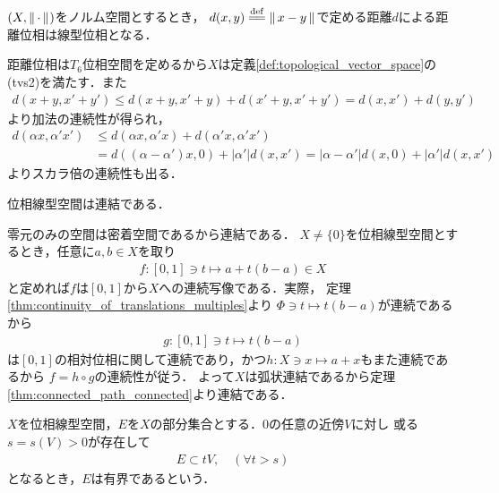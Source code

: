 	\begin{screen}
		\begin{thm}[ノルムで導入する距離位相は線型位相]
			$(X,\left\|\, \cdot\, \right\|_{})$をノルム空間とするとき，
			$d(x,y) \defeq \Norm{x-y}{}$で定める距離$d$による距離位相は線型位相となる．
		\end{thm}
	\end{screen}
	
	\begin{prf}
		距離位相は$T_6$位相空間を定めるから$X$は定義\ref{def:topological_vector_space}の(tvs2)を満たす．また
		\begin{align}
			d(x+y,x'+y') \leq d(x+y,x'+y) + d(x'+y,x'+y') = d(x,x') + d(y,y')
		\end{align}
		より加法の連続性が得られ，
		\begin{align}
			d(\alpha x, \alpha'x') &\leq d(\alpha x, \alpha'x) + d(\alpha'x,\alpha'x') \\
			&= d((\alpha - \alpha') x, 0) + |\alpha'|d(x,x')
			= |\alpha-\alpha'|d(x,0) + |\alpha'|d(x,x')
		\end{align}
		よりスカラ倍の連続性も出る．
		\QED
	\end{prf}
	
	\begin{screen}
		\begin{thm}[位相線型空間の連結性]\label{thm:topological_vector_spaces_connected}
			位相線型空間は連結である．
		\end{thm}
	\end{screen}
	
	\begin{prf}
		零元のみの空間は密着空間であるから連結である．
		$X \neq \{0\}$を位相線型空間とするとき，任意に$a,b \in X$を取り
		\begin{align}
			f:[0,1] \ni t \longmapsto a + t(b - a) \in X
		\end{align}
		と定めれば$f$は$[0,1]$から$X$への連続写像である．実際，
		定理\ref{thm:continuity_of_translations_multiples}より
		$\Phi \ni t \longmapsto t(b-a)$が連続であるから
		\begin{align}
			g:[0,1] \ni t \longmapsto t(b-a)
		\end{align}
		は$[0,1]$の相対位相に関して連続であり，かつ$h:X \ni x \longmapsto a + x$もまた連続であるから
		$f = h \circ g$の連続性が従う．
		よって$X$は弧状連結であるから定理\ref{thm:connected_path_connected}より連結である．
		\QED
	\end{prf}
	
	\begin{screen}
		\begin{dfn}[位相線形空間の有界集合]\label{def:boundedness_in_tvs}
			$X$を位相線型空間，$E$を$X$の部分集合とする．0の任意の近傍$V$に対し
			或る$s = s(V) > 0$が存在して
			\begin{align}
				E \subset t V, \quad (\forall t > s)
			\end{align}
			となるとき，$E$は有界であるという．
		\end{dfn}
	\end{screen}
	
